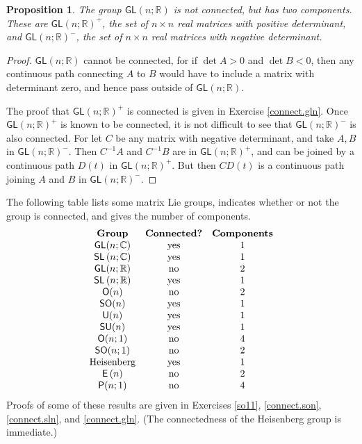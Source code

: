 \documentclass[12pt]{amsbook}
\theoremstyle{plain}
\newtheorem{proposition}[theorem]{Proposition}
\numberwithin{equation}{chapter}
\numberwithin{theorem}{chapter}
\begin{document}
\begin{proposition}
The group $\mathsf{GL}(n;\mathbb{R})$ is not connected, but has two
components. These are $\mathsf{GL}(n;\mathbb{R})^{+}$, the set of $n\times n$
real matrices with positive determinant, and $\mathsf{GL}(n;\mathbb{R})^{-}$,
the set of $n\times n$ real matrices with negative determinant.
\end{proposition}

\begin{proof}
$\mathsf{GL}(n;\mathbb{R})$ cannot be connected, for if $\det A>0$ and $\det
B<0$, then any continuous path connecting $A$ to $B$ would have to include a
matrix with determinant zero, and hence pass outside of $\mathsf{GL}%
(n;\mathbb{R})$.

The proof that $\mathsf{GL}(n;\mathbb{R})^{+}$ is connected is given in
Exercise \ref{connect.gln}. Once $\mathsf{GL}(n;\mathbb{R})^{+}$ is known to
be connected, it is not difficult to see that $\mathsf{GL}(n;\mathbb{R})^{-}$
is also connected. For let $C$ be any matrix with negative determinant, and
take $A,B$ in $\mathsf{GL}(n;\mathbb{R})^{-}$. Then $C^{-1}A$ and $C^{-1}B$
are in $\mathsf{GL}(n;\mathbb{R})^{+}$, and can be joined by a continuous path
$D(t)$ in $\mathsf{GL}(n;\mathbb{R})^{+}$. But then $CD(t)$ is a continuous
path joining $A$ and $B$ in $\mathsf{GL}(n;\mathbb{R})^{-}$.
\end{proof}

The following table lists some matrix Lie groups, indicates whether or not the
group is connected, and gives the number of components.
\[%
\begin{array}
[c]{ccc}%
\text{\textbf{Group}} & \text{\textbf{Connected?}} & \text{\textbf{Components}%
}\\
\mathsf{GL}(n;\mathbb{C}) & \text{yes} & 1\\
\mathsf{SL}\left(  n;\mathbb{C}\right)  & \text{yes} & 1\\
\mathsf{GL}(n;\mathbb{R}) & \text{no} & 2\\
\mathsf{SL}\left(  n;\mathbb{R}\right)  & \text{yes} & 1\\
\mathsf{O}(n) & \text{no} & 2\\
\mathsf{SO}(n) & \text{yes} & 1\\
\mathsf{U}(n) & \text{yes} & 1\\
\mathsf{SU}(n) & \text{yes} & 1\\
\mathsf{O}(n;1) & \text{no} & 4\\
\mathsf{SO}(n;1) & \text{no} & 2\\
\text{Heisenberg} & \text{yes} & 1\\
\mathsf{E}\left(  n\right)  & \text{no} & 2\\
\mathsf{P}(n;1) & \text{no} & 4
\end{array}
\]
Proofs of some of these results are given in Exercises \ref{so11},
\ref{connect.son}, \ref{connect.sln}, and \ref{connect.gln}. (The
connectedness of the Heisenberg group is immediate.)
\end{document}
